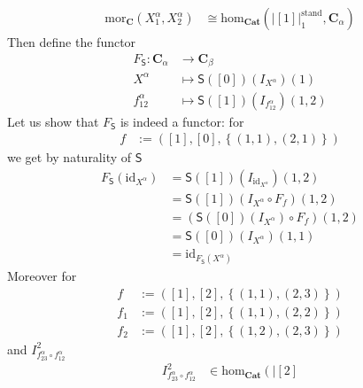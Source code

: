 \begin{prf}
\begin{description}
\begin{align*}
  \mathrm{mor}_{\mathbf{C}}(X_{1}^{\alpha},X_{2}^{\alpha})
  &\cong
  \mathrm{hom}_{\mathbf{Cat}}
  \left(
    \left\vert
      [1]
    \right\vert_{1}^{\textrm{stand}},
    \mathbf{C}_{\alpha}
  \right)
\end{align*}
Then define the functor
\begin{align*}
  F_{\mathsf{S}}
  \colon
  \mathbf{C}_{\alpha}
  &\rightarrow
  \mathbf{C}_{\beta}
  \\
  X^{\alpha}
  &\mapsto
  \mathsf{S}([0])(I_{X^{\alpha}})(1)
  \\
  f_{12}^{\alpha}
  &\mapsto
  \mathsf{S}([1])(I_{f_{12}^{\alpha}})(1,2)
\end{align*}
Let us show that $F_{\mathsf{S}}$ is indeed a functor: for
\begin{align*}
  f
  &:=
  \left(
    [1],
    [0],
    \left\lbrace
      (1,1),
      (2,1)
    \right\rbrace
  \right)
\end{align*}
we get by naturality of $\mathsf{S}$
\begin{align*}
  F_{\mathsf{S}}
  \left(
    \mathrm{id}_{X^{\alpha}}
  \right)
  &=
  \mathsf{S}([1])
  \left(
    I_{\mathrm{id}_{X^{\alpha}}}
  \right)
  (1,2)
  \\
  &=
  \mathsf{S}([1])
  \left(
    I_{X^{\alpha}}
    \circ
    F_{f}
  \right)
  (1,2)
  \\
  &=
  \left(
    \mathsf{S}([0])
    \left(
      I_{X^{\alpha}}
    \right)
    \circ
    F_{f}
  \right)
  (1,2)
  \tag{NT}
  \\
  &=
  \mathsf{S}([0])
  \left(
    I_{X^{\alpha}}
  \right)
  (1,1)
  \\
  &=
  \mathrm{id}_{F_{\mathsf{S}}(X^{\alpha})}
\end{align*}
Moreover for
\begin{align*}
  f
  &:=
  \left(
    [1],
    [2],
    \left\lbrace
      (1,1),
      (2,3)
    \right\rbrace  
  \right)
  \\
  f_{1}
  &:=
  \left(
    [1],
    [2],
    \left\lbrace
      (1,1),
      (2,2)
    \right\rbrace
  \right)
  \\
  f_{2}
  &:=
  \left(
    [1],
    [2],
    \left\lbrace
      (1,2),
      (2,3)
    \right\rbrace
  \right)
\end{align*}
and $I_{f_{23}^{\alpha} \circ f_{12}^{\alpha}}^{2}$
\begin{align*}
  I_{f_{23}^{\alpha} \circ f_{12}^{\alpha}}^{2}
  &\in
  \mathrm{hom}_{\mathbf{Cat}}
  \left(
    \left\vert
      [2]

\end{align*}
\end{description}
\end{prf}
